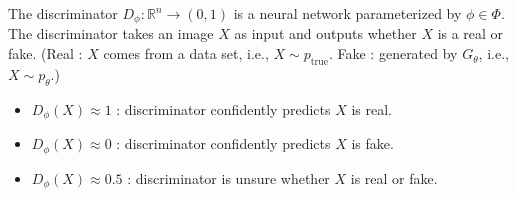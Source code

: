 \documentclass{report}
\begin{document}
\begin{definition}
    The discriminator $D_{\phi}: \mathbb{R}^{n} \rightarrow(0,1)$ is a neural network parameterized by $\phi \in \Phi$. The discriminator takes an image $X$ as input and outputs whether $X$ is a real or fake.
    (Real : $X$ comes from a data set, i.e., $X \sim p_{\text{true}}$. Fake : generated by $G_{\theta}$, i.e., $X \sim p_{\theta}$.)

    \begin{itemize}
        \item $D_{\phi}(X) \approx 1$ : discriminator confidently predicts $X$ is real.
        \item $D_{\phi}(X) \approx 0$ : discriminator confidently predicts $X$ is fake.
        \item $D_{\phi}(X) \approx 0.5$ : discriminator is unsure whether $X$ is real or fake.
    \end{itemize}
\end{definition}
\end{document}
